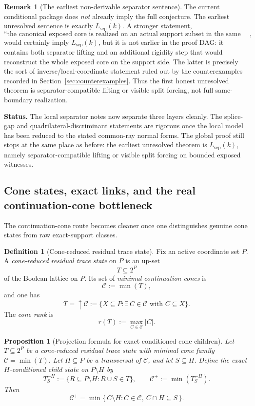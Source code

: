 \documentclass[11pt]{article}
\newtheorem{proposition}[theorem]{Proposition}
\theoremstyle{definition}
\newtheorem{definition}[theorem]{Definition}
\newtheorem{remark}[theorem]{Remark}
\newcommand{\1}{\mathbf{1}}
\newcommand{\status}[1]{\par\smallskip\noindent\textbf{Status.} #1\par\smallskip}
\begin{document}
\begin{remark}[The earliest non-derivable separator sentence]\label{rem:lsep-earliest-gap}
The current conditional package does \emph{not} already imply the full conjecture. The earliest unresolved sentence is exactly $L_{\mathrm{sep}}(k)$. A stronger statement,
\[
\text{``the canonical exposed core is realized on an actual support subset in the same boundary metric''},
\]
would certainly imply $L_{\mathrm{sep}}(k)$, but it is not earlier in the proof DAG: it contains both separator lifting and an additional rigidity step that would reconstruct the whole exposed core on the support side. The latter is precisely the sort of inverse/local-coordinate statement ruled out by the counterexamples recorded in Section~\ref{sec:counterexamples}. Thus the first honest unresolved theorem is separator-compatible lifting or visible split forcing, not full same-boundary realization.
\end{remark}

\status{The local separator notes now separate three layers cleanly. The splice-gap and quadrilateral-discriminant statements are rigorous once the local model has been reduced to the stated common-ray normal forms. The global proof still stops at the same place as before: the earliest unresolved theorem is $L_{\mathrm{sep}}(k)$, namely separator-compatible lifting or visible split forcing on bounded exposed witnesses.}


\subsection*{Cone states, exact links, and the real continuation-cone bottleneck}
The continuation-cone route becomes cleaner once one distinguishes genuine cone states from raw exact-support classes.

\begin{definition}[Cone-reduced residual trace state]\label{def:cone-state}
Fix an active coordinate set $P$.
A \emph{cone-reduced residual trace state} on $P$ is an up-set
\[
T\subseteq 2^P
\]
of the Boolean lattice on $P$.
Its set of \emph{minimal continuation cones} is
\[
\mathcal C:=\min(T),
\]
and one has
\[
T=\uparrow \mathcal C:=\{X\subseteq P:\exists\, C\in \mathcal C \text{ with } C\subseteq X\}.
\]
The \emph{cone rank} is
\[
r(T):=\max_{C\in \mathcal C} |C|.
\]
\end{definition}

\begin{proposition}[Projection formula for exact conditioned cone children]\label{prop:cone-child-projection}
Let $T\subseteq 2^P$ be a cone-reduced residual trace state with minimal cone family $\mathcal C=\min(T)$.
Let $H\subseteq P$ be a transversal of $\mathcal C$, and let $S\subseteq H$.
Define the exact $H$-conditioned child state on $P\setminus H$ by
\[
T_S^{-H}:=\{R\subseteq P\setminus H : R\cup S\in T\},
\qquad
\mathcal C^+:=\min(T_S^{-H}).
\]
Then
\[
\mathcal C^+
=
\min\{\, C\setminus H : C\in \mathcal C,\ C\cap H\subseteq S\,\}.
\]
\end{proposition}
\end{document}
